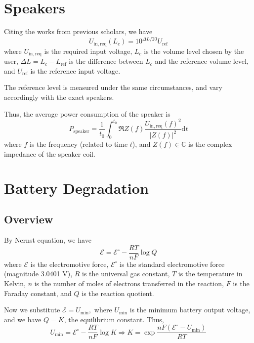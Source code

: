 \documentclass[12pt]{article}
\begin{document}
\section{Speakers}

Citing the works from previous scholars, we have
\begin{equation}
	U_\mathrm{in,req}(L_c)=10^{\Delta L/20}U_\mathrm{ref}
\end{equation}
where $U_\mathrm{in,req}$ is the required input voltage, $L_c$ is the volume level chosen by the user, $\Delta L=L_c-L_\mathrm{ref}$ is the difference between $L_c$ and the reference volume level, and $U_\mathrm{ref}$ is the reference input voltage.

The reference level is measured under the same circumstances, and vary accordingly with the exact speakers.

Thus, the average power consumption of the speaker is
\begin{equation}
	P_\mathrm{speaker}=\frac{1}{t_0}\int_0^{t_0}\Re Z(f)\frac{U_\mathrm{in,req}(f)^2}{|Z(f)|^2}\mathrm dt
\end{equation}
where $f$ is the frequency (related to time $t$), and $Z(f)\in\mathbb C$ is the complex impedance of the speaker coil.

\section{Battery Degradation}

\subsection{Overview}

By Nernst equation, we have
\begin{equation}
	\mathcal E=\mathcal E^{\circ}-\frac{RT}{nF}\log Q
\end{equation}
where $\mathcal E$ is the electromotive force, $\mathcal E^{\circ}$ is the standard electromotive force (magnitude 3.0401 V), $R$ is the universal gas constant, $T$ is the temperature in Kelvin, $n$ is the number of moles of electrons transferred in the reaction, $F$ is the Faraday constant, and $Q$ is the reaction quotient.

Now we substitute $\mathcal E=U_\mathrm{min},$ where $U_\mathrm{min}$ is the minimum battery output voltage, and we have $Q=K$, the equilibrium constant. Thus,
\begin{equation}
	U_\mathrm{min}=\mathcal E^{\circ}-\frac{RT}{nF}\log K\Rightarrow K=\exp{\frac{nF(\mathcal E^{\circ}-U_\mathrm{min})}{RT}}
\end{equation}
\end{document}
